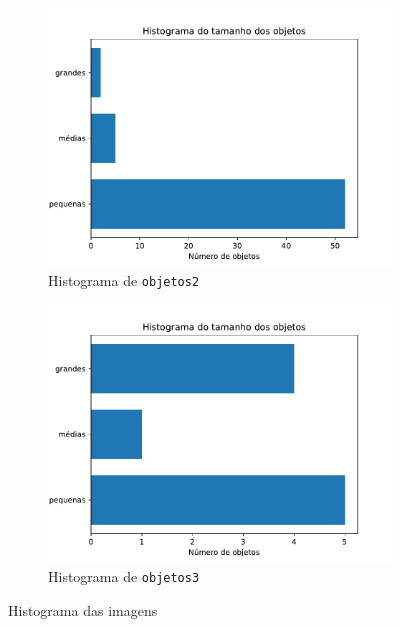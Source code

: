 \documentclass[brazilian,a4paper,twocolumn]{article}
\begin{document}
\begin{figure}[H]
            \begin{subfigure}{0.48\textwidth}
                \includegraphics[width=\textwidth,keepaspectratio]{objetos2-histograma}
                \caption{Histograma de \texttt{objetos2}}
                \label{fig:objetos2-histograma}
            \end{subfigure}

            \begin{subfigure}{0.48\textwidth}
                \includegraphics[width=\textwidth,keepaspectratio]{objetos3-histograma}
                \caption{Histograma de \texttt{objetos3}}
                \label{fig:objetos3-histograma}
            \end{subfigure}

            \caption{Histograma das imagens}
            \label{fig:histogramas}
        \end{figure}
\end{document}
